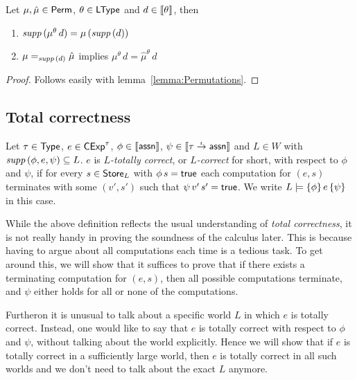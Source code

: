 \documentclass[12pt,a4paper]{report}
\newcommand{\CExp}{\sstyle{CExp}}
\begin{document}
\begin{lemma} \label{lemma:Permutations_and_semantic_domains}
  Let $\mu,\hat{\mu}\in\mathsf{Perm}$, $\theta\in\mathsf{LType}$ and $d \in \llbracket\theta\rrbracket$, then
  \begin{enumerate}
    \item $\mathit{supp}\,(\mu^\theta\,d) = \mu\,(\mathit{supp}\,(d))$
    \item $\mu =_{\mathit{supp}\,(d)} \hat{\mu}$ implies $\mu^\theta\,d = \hat{\mu}^\theta\,d$
  \end{enumerate}
\end{lemma}

\begin{proof}
  Follows easily with lemma~\ref{lemma:Permutations}.
\end{proof}



\subsection{Total correctness}

\begin{definition}
  Let $\tau\in\mathsf{Type}$, $e\in\CExp^\tau$, $\phi\in\llbracket\mathsf{assn}\rrbracket$, $\psi\in\llbracket\tau\stackrel{_t}{\to}\mathsf{assn}\rrbracket$
  and $L\in W$ with $\mathit{supp}\,(\phi,e,\psi) \subseteq L$.
  $e$ is {\em $L$-totally correct}, or {\em $L$-correct} for short, with respect to $\phi$ and
  $\psi$, if for every $s\in\mathsf{Store}_L$ with $\phi\,s=\mathsf{true}$ each computation for $(e,s)$ terminates with some
  $(v',s')$ such that $\psi\,v'\,s'=\mathsf{true}$. We write $L \models \{\phi\}\,e\,\{\psi\}$ in this case.
\end{definition}

While the above definition reflects the usual understanding of {\em total correctness}, it is not really handy
in proving the soundness of the calculus later. This is because having to argue about all computations each
time is a tedious task. To get around this, we will show that it suffices to prove that if there exists a
terminating computation for $(e,s)$, then all possible computations terminate, and $\psi$ either holds for all
or none of the computations.

Furtheron it is unusual to talk about a specific world $L$ in which $e$ is totally correct. Instead, one would
like to say that $e$ is totally correct with respect to $\phi$ and $\psi$, without talking about the world
explicitly. Hence we will show that if $e$ is totally correct in a sufficiently large world, then $e$ is
totally correct in all such worlds and we don't need to talk about the exact $L$ anymore.
\end{document}
